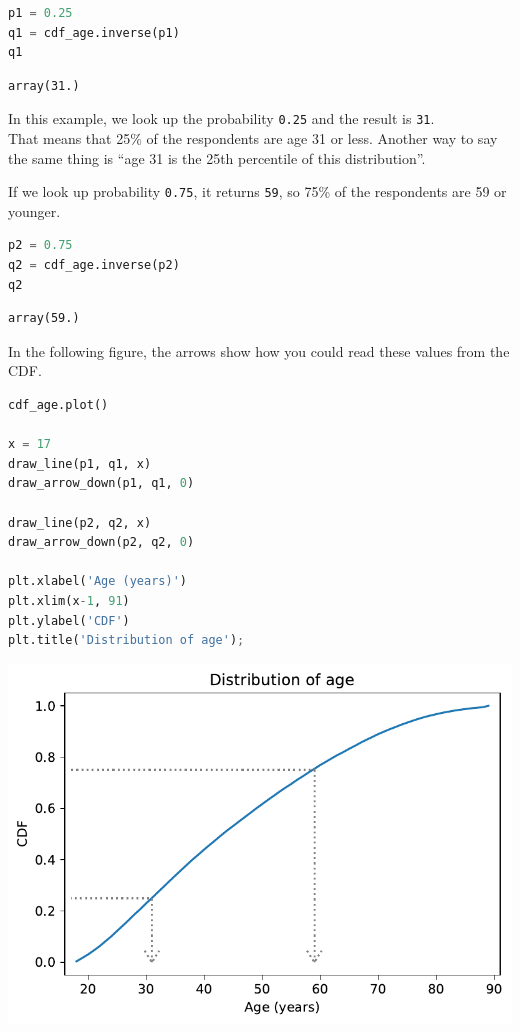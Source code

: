\begin{lstlisting}[language=Python]
p1 = 0.25
q1 = cdf_age.inverse(p1)
q1
\end{lstlisting}

\begin{lstlisting}[]
array(31.)
\end{lstlisting}

In this example, we look up the probability
\passthrough{\lstinline!0.25!} and the result is
\passthrough{\lstinline!31!}.\\
That means that 25\% of the respondents are age 31 or less. Another way
to say the same thing is ``age 31 is the 25th percentile of this
distribution''.

If we look up probability \passthrough{\lstinline!0.75!}, it returns
\passthrough{\lstinline!59!}, so 75\% of the respondents are 59 or
younger.

\begin{lstlisting}[language=Python]
p2 = 0.75
q2 = cdf_age.inverse(p2)
q2
\end{lstlisting}

\begin{lstlisting}[]
array(59.)
\end{lstlisting}

In the following figure, the arrows show how you could read these values
from the CDF.

\begin{lstlisting}[language=Python]
cdf_age.plot()

x = 17
draw_line(p1, q1, x)
draw_arrow_down(p1, q1, 0)

draw_line(p2, q2, x)
draw_arrow_down(p2, q2, 0)

plt.xlabel('Age (years)')
plt.xlim(x-1, 91)
plt.ylabel('CDF')
plt.title('Distribution of age');
\end{lstlisting}

\begin{center}
\includegraphics[scale=0.75]{chapters/08_distributions_files/08_distributions_79_0.pdf}
\end{center}

